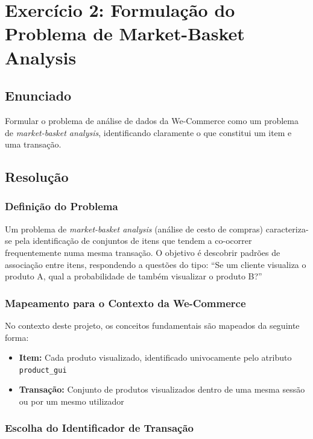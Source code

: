 \documentclass[11pt,a4paper]{article}
\begin{document}
\newpage

\section{Exercício 2: Formulação do Problema de Market-Basket Analysis}

\subsection{Enunciado}

Formular o problema de análise de dados da We-Commerce como um problema de \textit{market-basket analysis}, identificando claramente o que constitui um item e uma transação.

\subsection{Resolução}

\subsubsection{Definição do Problema}

Um problema de \textit{market-basket analysis} (análise de cesto de compras) caracteriza-se pela identificação de conjuntos de itens que tendem a co-ocorrer frequentemente numa mesma transação. O objetivo é descobrir padrões de associação entre itens, respondendo a questões do tipo: ``Se um cliente visualiza o produto A, qual a probabilidade de também visualizar o produto B?''

\subsubsection{Mapeamento para o Contexto da We-Commerce}

No contexto deste projeto, os conceitos fundamentais são mapeados da seguinte forma:

\begin{itemize}
    \item \textbf{Item:} Cada produto visualizado, identificado univocamente pelo atributo \texttt{product\_gui}
    \item \textbf{Transação:} Conjunto de produtos visualizados dentro de uma mesma sessão ou por um mesmo utilizador
\end{itemize}

\subsubsection{Escolha do Identificador de Transação}
\end{document}
